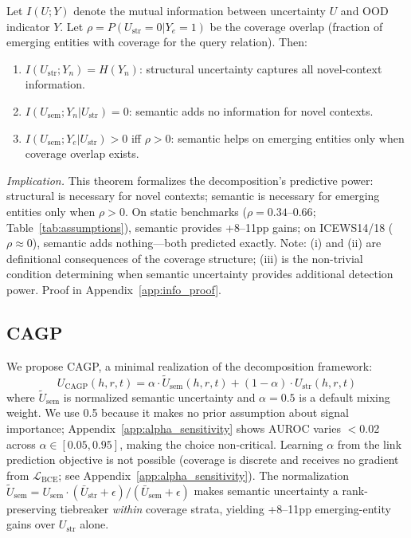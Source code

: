\begin{theorem}
\label{thm:info_decomp}
Let $I(U; Y)$ denote the mutual information between uncertainty $U$ and OOD indicator $Y$. Let $\rho = P(U_{\text{str}} = 0 | Y_e = 1)$ be the coverage overlap (fraction of emerging entities with coverage for the query relation). Then:
\begin{enumerate}
\item[(i)] $I(U_{\text{str}}; Y_n) = H(Y_n)$: structural uncertainty captures all novel-context information.
\item[(ii)] $I(U_{\text{sem}}; Y_n | U_{\text{str}}) = 0$: semantic adds no information for novel contexts.
\item[(iii)] $I(U_{\text{sem}}; Y_e | U_{\text{str}}) > 0$ iff $\rho > 0$: semantic helps on emerging entities only when coverage overlap exists.
\end{enumerate}
\end{theorem}

\emph{Implication.} This theorem formalizes the decomposition's predictive power: structural is necessary for novel contexts; semantic is necessary for emerging entities only when $\rho > 0$. On static benchmarks ($\rho = 0.34$--$0.66$; Table~\ref{tab:assumptions}), semantic provides +8--11pp gains; on ICEWS14/18 ($\rho \approx 0$), semantic adds nothing---both predicted exactly. Note: (i) and (ii) are definitional consequences of the coverage structure; (iii) is the non-trivial condition determining when semantic uncertainty provides additional detection power. Proof in Appendix~\ref{app:info_proof}.

\subsection{CAGP}
\label{sec:cagp}

We propose CAGP, a minimal realization of the decomposition framework:
\begin{equation}
    U_{\text{CAGP}}(h,r,t) = \alpha \cdot \tilde{U}_{\text{sem}}(h,r,t) + (1-\alpha) \cdot U_{\text{str}}(h,r,t)
    \label{eq:cagp}
\end{equation}
where $\tilde{U}_{\text{sem}}$ is normalized semantic uncertainty and $\alpha{=}0.5$ is a default mixing weight. We use 0.5 because it makes no prior assumption about signal importance; Appendix~\ref{app:alpha_sensitivity} shows AUROC varies $<$0.02 across $\alpha \in [0.05, 0.95]$, making the choice non-critical. Learning $\alpha$ from the link prediction objective is not possible (coverage is discrete and receives no gradient from $\mathcal{L}_{\text{BCE}}$; see Appendix~\ref{app:alpha_sensitivity}). The normalization $\tilde{U}_{\text{sem}} = U_{\text{sem}} \cdot (\bar{U}_{\text{str}} + \epsilon) / (\bar{U}_{\text{sem}} + \epsilon)$ makes semantic uncertainty a rank-preserving tiebreaker \emph{within} coverage strata, yielding +8--11pp emerging-entity gains over $U_{\text{str}}$ alone.

